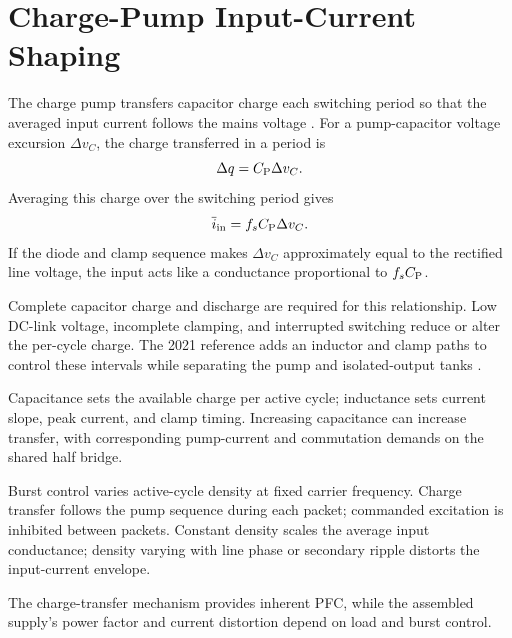 \section{Charge-Pump Input-Current Shaping}
\label{sec:bg-chargepump}

The charge pump transfers capacitor charge each switching period so that the averaged input current follows the mains voltage \cite{ammar2020chargepump,ammar2021led}. For a pump-capacitor voltage excursion \(\Delta v_C\), the charge transferred in a period is
\begin{equation}
\Delta q=C_{\mathrm{P}}\Delta v_C.
\end{equation}
Averaging this charge over the switching period gives
\begin{equation}
\overline{i}_{\mathrm{in}}=f_sC_{\mathrm{P}}\Delta v_C.
\label{eq:bg-charge-pump-average-current}
\end{equation}
If the diode and clamp sequence makes \(\Delta v_C\) approximately equal to the rectified line voltage, the input acts like a conductance proportional to \(f_sC_{\mathrm{P}}\).

Complete capacitor charge and discharge are required for this relationship. Low DC-link voltage, incomplete clamping, and interrupted switching reduce or alter the per-cycle charge. The 2021 reference adds an inductor and clamp paths to control these intervals while separating the pump and isolated-output tanks \cite{ammar2021led}.

Capacitance sets the available charge per active cycle; inductance sets current slope, peak current, and clamp timing. Increasing capacitance can increase transfer, with corresponding pump-current and commutation demands on the shared half bridge.

Burst control varies active-cycle density at fixed carrier frequency. Charge transfer follows the pump sequence during each packet; commanded excitation is inhibited between packets. Constant density scales the average input conductance; density varying with line phase or secondary ripple distorts the input-current envelope.

The charge-transfer mechanism provides inherent PFC, while the assembled supply's power factor and current distortion depend on load and burst control.
